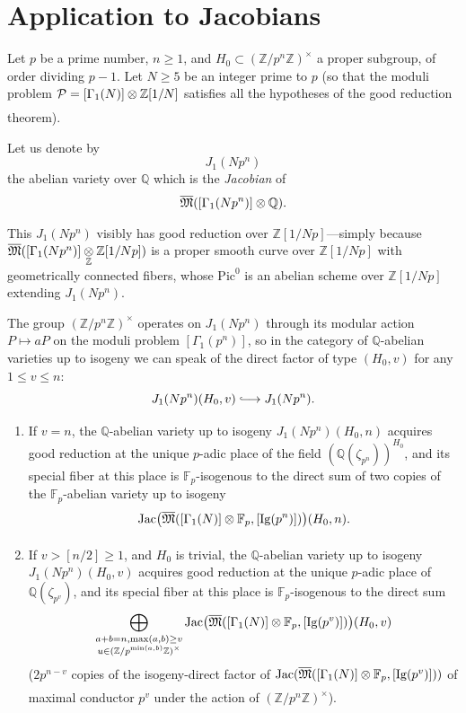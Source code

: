 \section{Application to Jacobians}
\label{sec:14.7}

\kmitem\label{item:14.7.1} Let $p$ be a prime number, $n \ge 1$, and $H_0 \subset (\mathbb{Z}/p^n\mathbb{Z})^\times$ a proper subgroup, of order dividing $p-1$. Let $N \ge 5$ be an integer prime to $p$ (so that the moduli problem $\mathcal{P} = [\Gamma_1(N)] \underset{}{\otimes} \mathbb{Z}[1/N]$ satisfies all the hypotheses of the good reduction theorem).

Let us denote by
\[
J_1(Np^n)
\]
the abelian variety over $\mathbb{Q}$ which is the \emph{Jacobian} of
\[
\overline{\mathfrak{M}}([\Gamma_1(Np^n)] \underset{}{\otimes} \mathbb{Q}) .
\]
This $J_1(Np^n)$ visibly has good reduction over $\mathbb{Z}[1/Np]$---simply because $\overline{\mathfrak{M}}([\Gamma_1(Np^n)] \underset{\mathbb{Z}}{\otimes} \mathbb{Z}[1/Np])$ is a proper smooth curve over $\mathbb{Z}[1/Np]$ with geometrically connected fibers, whose $\mathrm{Pic}^0$ is an abelian scheme over $\mathbb{Z}[1/Np]$ extending $J_1(Np^n)$.

The group $(\mathbb{Z}/p^n\mathbb{Z})^\times$ operates on $J_1(Np^n)$ through its modular action $P \mapsto aP$ on the moduli problem $[\Gamma_1(p^n)]$, so in the category of $\mathbb{Q}$-abelian varieties up to isogeny we can speak of the direct factor of type $(H_0, v)$ for any $1 \le v \le n$:
\[
J_1(Np^n)(H_0, v) \mathrel{\lhook\joinrel\longrightarrow} J_1(Np^n) .
\]

\begin{theorem}\label{thm:14.7.2}
\begin{enumerate}[label=(\arabic*)]
\item If $v = n$, the $\mathbb{Q}$-abelian variety up to isogeny $J_1(Np^n)(H_0, n)$ acquires good reduction at the unique $p$-adic place of the field $(\mathbb{Q}(\zeta_{p^n}))^{H_0}$, and its special fiber at this place is $\mathbb{F}_p$-isogenous to the direct sum of two copies of the $\mathbb{F}_p$-abelian variety up to isogeny
\[
\mathrm{Jac}\bigl( \overline{\mathfrak{M}}([\Gamma_1(N)] \underset{}{\otimes} \mathbb{F}_p, [\mathrm{Ig}(p^n)]) \bigr)(H_0, n) .
\]
\item If $v > [n/2] \ge 1$, and $H_0$ is trivial, the $\mathbb{Q}$-abelian variety up to isogeny $J_1(Np^n)(H_0, v)$ acquires good reduction at the unique $p$-adic place of $\mathbb{Q}(\zeta_{p^v})$, and its special fiber at this place is $\mathbb{F}_p$-isogenous to the direct sum
\[
\bigoplus_{\substack{a+b=n, \max(a,b) \ge v \\ u \in (\mathbb{Z}/p^{\min(a,b)}\mathbb{Z})^\times}} \mathrm{Jac}\bigl( \overline{\mathfrak{M}}([\Gamma_1(N)] \underset{}{\otimes} \mathbb{F}_p, [\mathrm{Ig}(p^v)]) \bigr)(H_0, v)
\]
($2 p^{n-v}$ copies of the isogeny-direct factor of $\mathrm{Jac}(\overline{\mathfrak{M}}([\Gamma_1(N)] \underset{}{\otimes} \mathbb{F}_p, [\mathrm{Ig}(p^v)]))$ of maximal conductor $p^v$ under the action of $(\mathbb{Z}/p^n\mathbb{Z})^\times$).
\end{enumerate}
\end{theorem}

